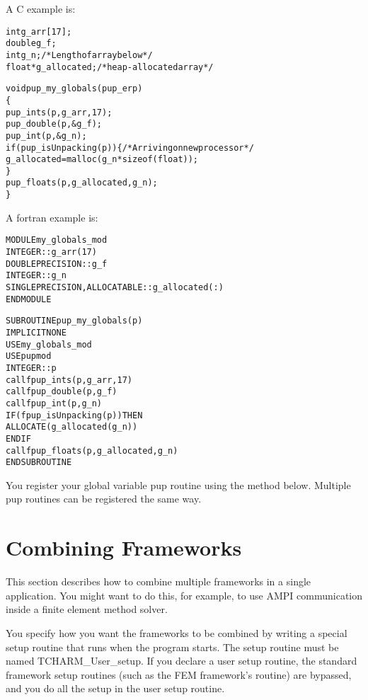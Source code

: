 \documentclass[10pt]{article}
\begin{document}
A C example is:
\begin{alltt}
     int g_arr[17];
     double g_f;
     int g_n; /*Length of array below*/
     float *g_allocated; /*heap-allocated array*/
 
     void pup_my_globals(pup_er p)
     \{
       pup_ints(p,g_arr,17);
       pup_double(p,&g_f);
       pup_int(p,&g_n);
       if (pup_isUnpacking(p)) \{ /*Arriving on new processor*/
         g_allocated=malloc(g_n*sizeof(float));
       \}
       pup_floats(p,g_allocated,g_n);
     \}
\end{alltt}

A fortran example is:
\begin{alltt}
     MODULE my_globals_mod
       INTEGER :: g_arr(17)
       DOUBLE PRECISION :: g_f
       INTEGER :: g_n
       SINGLE PRECISION, ALLOCATABLE :: g_allocated(:)
     END MODULE
 
     SUBROUTINE pup_my_globals(p)
       IMPLICIT NONE
       USE my_globals_mod
       USE pupmod
       INTEGER :: p
       call fpup_ints(p,g_arr,17)
       call fpup_double(p,g_f)
       call fpup_int(p,g_n)
       IF (fpup_isUnpacking(p)) THEN
         ALLOCATE(g_allocated(g_n))
       END IF
       call fpup_floats(p,g_allocated,g_n)
     END SUBROUTINE
\end{alltt}


You register your global variable pup routine using the method below.
Multiple pup routines can be registered the same way.

\vspace{0.2in}



\section{Combining Frameworks}
\label{sec:combining}

This section describes how to combine multiple frameworks in a 
single application.  You might want to do this, for example,
to use AMPI communication inside a finite element method solver.

You specify how you want the frameworks to be combined by writing
a special setup routine that runs when the program starts.
The setup routine must be named TCHARM\_User\_setup.  If you declare a 
user setup routine, the standard framework setup routines (such
as the FEM framework's  routine) are bypassed, and you
do all the setup in the user setup routine.
\end{document}
